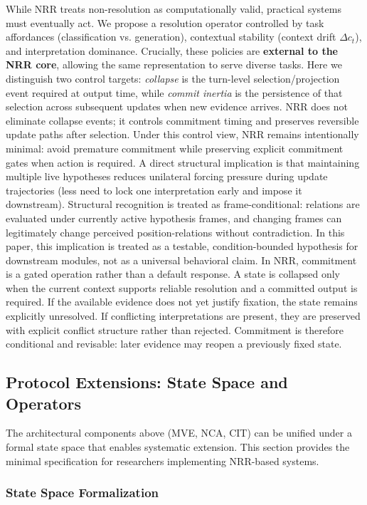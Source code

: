 \documentclass[11pt,a4paper]{article}
\begin{document}
While NRR treats non-resolution as computationally valid, practical systems must eventually act.
We propose a resolution operator controlled by task affordances (classification vs. generation), contextual stability (context drift $\Delta c_t$), and interpretation dominance.
Crucially, these policies are \textbf{external to the NRR core}, allowing the same representation to serve diverse tasks.
Here we distinguish two control targets: \emph{collapse} is the turn-level selection/projection event required at output time, while \emph{commit inertia} is the persistence of that selection across subsequent updates when new evidence arrives. NRR does not eliminate collapse events; it controls commitment timing and preserves reversible update paths after selection.
Under this control view, NRR remains intentionally minimal: avoid premature commitment while preserving explicit commitment gates when action is required. A direct structural implication is that maintaining multiple live hypotheses reduces unilateral forcing pressure during update trajectories (less need to lock one interpretation early and impose it downstream). Structural recognition is treated as frame-conditional: relations are evaluated under currently active hypothesis frames, and changing frames can legitimately change perceived position-relations without contradiction. In this paper, this implication is treated as a testable, condition-bounded hypothesis for downstream modules, not as a universal behavioral claim.
In NRR, commitment is a gated operation rather than a default response.
A state is collapsed only when the current context supports reliable resolution and a committed output is required.
If the available evidence does not yet justify fixation, the state remains explicitly unresolved.
If conflicting interpretations are present, they are preserved with explicit conflict structure rather than rejected.
Commitment is therefore conditional and revisable: later evidence may reopen a previously fixed state.

\subsection{Protocol Extensions: State Space and Operators}
\label{sec:protocol}

The architectural components above (MVE, NCA, CIT) can be unified under a formal state space that enables systematic extension. This section provides the minimal specification for researchers implementing NRR-based systems.

\subsubsection{State Space Formalization}
\end{document}
